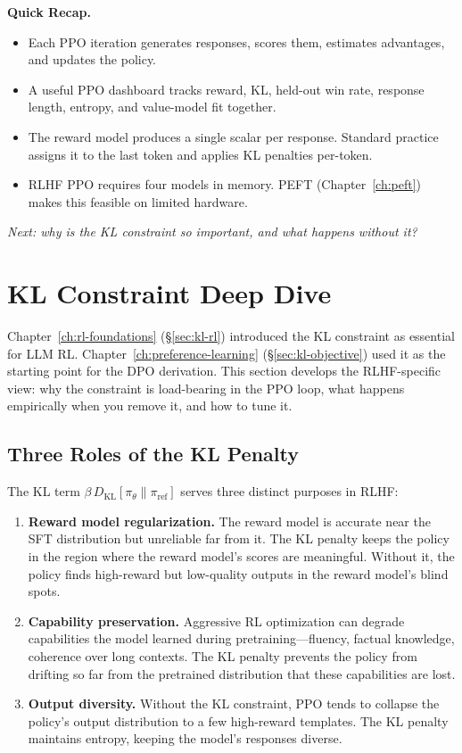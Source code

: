 \begin{quickrecap}
\textbf{Quick Recap.}
\begin{itemize}[nosep,leftmargin=1.5em]
  \item Each PPO iteration generates responses, scores them, estimates advantages, and updates the policy.
  \item A useful PPO dashboard tracks reward, KL, held-out win rate, response length, entropy, and value-model fit together.
  \item The reward model produces a single scalar per response. Standard practice assigns it to the last token and applies KL penalties per-token.
  \item RLHF PPO requires four models in memory. PEFT (Chapter~\ref{ch:peft}) makes this feasible on limited hardware.
\end{itemize}
\textit{Next: why is the KL constraint so important, and what happens without it?}
\end{quickrecap}


\section{KL Constraint Deep Dive}
\label{sec:kl-deep-dive}

Chapter~\ref{ch:rl-foundations} (\S\ref{sec:kl-rl}) introduced the KL constraint as essential for LLM RL. Chapter~\ref{ch:preference-learning} (\S\ref{sec:kl-objective}) used it as the starting point for the DPO derivation. This section develops the RLHF-specific view: why the constraint is load-bearing in the PPO loop, what happens empirically when you remove it, and how to tune it.

\subsection{Three Roles of the KL Penalty}

The KL term $\beta \, D_{\text{KL}}[\pi_\theta \| \pi_{\text{ref}}]$ serves three distinct purposes in RLHF:

\begin{enumerate}[nosep]
  \item \textbf{Reward model regularization.} The reward model is accurate near the SFT distribution but unreliable far from it. The KL penalty keeps the policy in the region where the reward model's scores are meaningful. Without it, the policy finds high-reward but low-quality outputs in the reward model's blind spots.
  \item \textbf{Capability preservation.} Aggressive RL optimization can degrade capabilities the model learned during pretraining---fluency, factual knowledge, coherence over long contexts. The KL penalty prevents the policy from drifting so far from the pretrained distribution that these capabilities are lost.
  \item \textbf{Output diversity.} Without the KL constraint, PPO tends to collapse the policy's output distribution to a few high-reward templates. The KL penalty maintains entropy, keeping the model's responses diverse.
\end{enumerate}


